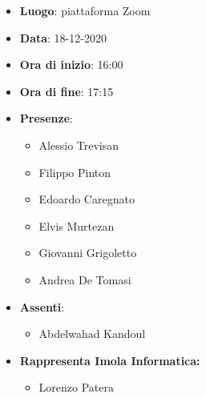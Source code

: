 \begin{itemize}
    \item \textbf{Luogo}: piattaforma Zoom
    \item \textbf{Data}: 18-12-2020
    \item \textbf{Ora di inizio}: 16:00
    \item \textbf{Ora di fine}: 17:15
    \item \textbf{Presenze}:
          \begin{itemize}
              \item Alessio Trevisan
              \item Filippo Pinton
              \item Edoardo Caregnato
              \item Elvis Murtezan
              \item Giovanni Grigoletto
              \item Andrea De Tomasi
          \end{itemize}
     \item \textbf{Assenti}:
    	     \begin{itemize}
              	\item Abdelwahad Kandoul
	\end{itemize}
	\item \textbf{Rappresenta Imola Informatica:}
	\begin{itemize}
		\item Lorenzo Patera
	\end{itemize}
\end{itemize}